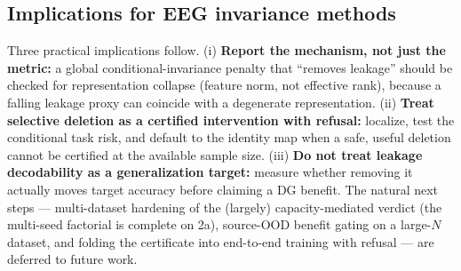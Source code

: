 \subsection{Implications for EEG invariance methods}
Three practical implications follow. (i) \textbf{Report the mechanism, not just the metric:} a global
conditional-invariance penalty that ``removes leakage'' should be checked for representation collapse (feature
norm, not effective rank), because a falling leakage proxy can coincide with a degenerate representation.
(ii) \textbf{Treat selective deletion as a certified intervention with refusal:} localize, test the conditional
task risk, and default to the identity map when a safe, useful deletion cannot be certified at the available
sample size. (iii) \textbf{Do not treat leakage decodability as a generalization target:} measure whether
removing it actually moves target accuracy before claiming a DG benefit. The natural next steps ---
multi-dataset hardening of the (largely) capacity-mediated verdict (the multi-seed factorial is complete on 2a), source-OOD benefit gating on a large-$N$ dataset, and folding the certificate into end-to-end training with
refusal --- are deferred to future work.
